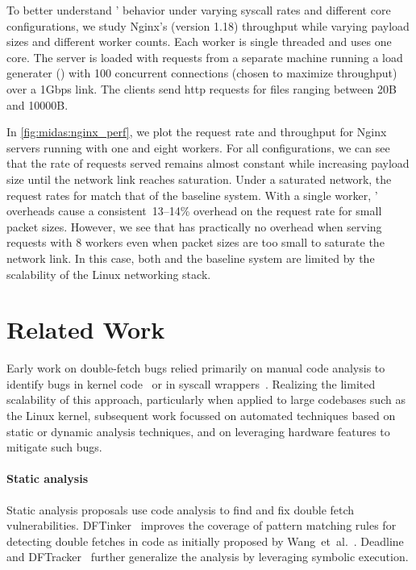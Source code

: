 To better understand \midas' behavior under varying syscall
rates and different core configurations, we study Nginx's (version 1.18)
throughput while varying payload sizes and different worker counts.
Each worker is single threaded and uses one core.
The server is loaded with requests from a separate machine running
a load generater () with 100 concurrent
connections (chosen to maximize throughput) over a 1Gbps link.
The clients send http requests for files ranging between 20B and
10000B.

In \autoref{fig:midas:nginx_perf}, we plot the request rate and throughput
for Nginx servers running with one and eight workers.
For all configurations, we can see that the rate of requests served
remains almost constant while increasing payload size until the network
link reaches saturation.
Under a saturated network, the request rates for \midas match that
of the baseline system.
With a single worker, \midas' overheads cause a consistent~13--14\%
overhead on the request rate for small packet sizes.
However, we see that \midas has practically no overhead when serving
requests with 8 workers even when packet sizes are too small to
saturate the network link.
In this case, both \midas and the baseline system are limited by the
scalability of the Linux networking stack.

\section{Related Work}

Early work on double-fetch bugs relied primarily on manual
code analysis to identify bugs in kernel code~\cite{YangCSS12, twizsgrakky07ring0}
or in syscall wrappers~\cite{watson2007exploiting}.
Realizing the limited scalability of this approach, particularly
when applied to large codebases such as the Linux kernel, subsequent 
work focussed on automated techniques based on static or dynamic 
analysis techniques, and on leveraging hardware features to mitigate
such bugs.


\paragraph{Static analysis}
%
Static analysis proposals use code analysis to find and fix double fetch
vulnerabilities.
DFTinker~\cite{dftinker} improves the coverage of pattern matching rules
for detecting double fetches in code as initially proposed by Wang~et~al.~\cite{wang2017double}.
Deadline~\cite{deadline} and DFTracker~\cite{wang2019dftracker} further
generalize the analysis by leveraging symbolic execution.

